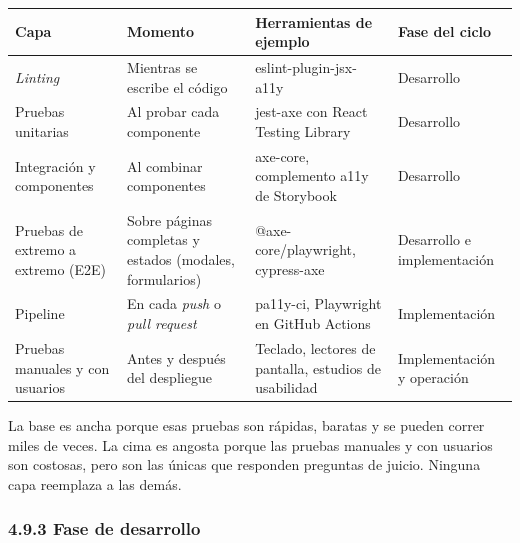 \documentclass[10pt,letterpaper,onecolumn]{IEEEtran}
\newcommand{\filafina}{\arrayrulecolor{black!30}\specialrule{0.3pt}{1.5pt}{1.5pt}\arrayrulecolor{black}}
\begin{document}
\begin{longtable}[]{@{}
  >{\raggedright\arraybackslash}p{0.1918\dimexpr\linewidth-6\tabcolsep\relax}
  >{\raggedright\arraybackslash}p{0.2740\dimexpr\linewidth-6\tabcolsep\relax}
  >{\raggedright\arraybackslash}p{0.3288\dimexpr\linewidth-6\tabcolsep\relax}
  >{\raggedright\arraybackslash}p{0.2055\dimexpr\linewidth-6\tabcolsep\relax}@{}}
\toprule\noalign{}
\begin{minipage}[b]{\linewidth}\raggedright
Capa
\end{minipage} & \begin{minipage}[b]{\linewidth}\raggedright
Momento
\end{minipage} & \begin{minipage}[b]{\linewidth}\raggedright
Herramientas de ejemplo
\end{minipage} & \begin{minipage}[b]{\linewidth}\raggedright
Fase del ciclo
\end{minipage} \\
\midrule\noalign{}
\endhead
\bottomrule\noalign{}
\endlastfoot
\emph{Linting} & Mientras se escribe el código & eslint-plugin-jsx-a11y & Desarrollo \\ \filafina
Pruebas unitarias & Al probar cada componente & jest-axe con React Testing Library & Desarrollo \\ \filafina
Integración y componentes & Al combinar componentes & axe-core, complemento a11y de Storybook & Desarrollo \\ \filafina
Pruebas de extremo a extremo (E2E) & Sobre páginas completas y estados (modales, formularios) & @axe-core/playwright, cypress-axe & Desarrollo e implementación \\ \filafina
Pipeline & En cada \emph{push} o \emph{pull request} & pa11y-ci, Playwright en GitHub Actions & Implementación \\ \filafina
Pruebas manuales y con usuarios & Antes y después del despliegue & Teclado, lectores de pantalla, estudios de usabilidad & Implementación y operación \\
\end{longtable}

La base es ancha porque esas pruebas son rápidas, baratas y se pueden correr miles de veces. La cima es angosta porque las pruebas manuales y con usuarios son costosas, pero son las únicas que responden preguntas de juicio. Ninguna capa reemplaza a las demás.

\subsubsection{4.9.3 Fase de desarrollo}\label{fase-de-desarrollo}
\end{document}
